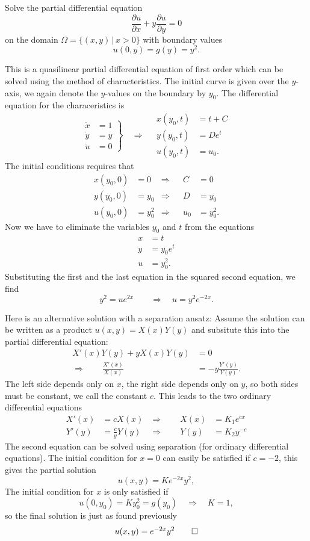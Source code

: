 Solve the partial differential equation
\[
\frac{\partial u}{\partial x}+y\frac{\partial u}{\partial y}=0
\]
on the domain
$\Omega=\{(x,y)\,|\, x> 0\}$ with boundary values
\[
u(0,y)=g(y)=y^2.
\]

\begin{loesung}
This is a quasilinear partial differential equation of first order
which can be solved using the method of characteristics.
The initial curve is given over the $y$-axis, we again denote the
$y$-values on the boundary by $y_0$.
The differential equation for the characeristics is
\[
\left.
\begin{aligned}
\dot x&=1\\
\dot y&=y\\
\dot u&=0
\end{aligned}
\right\}\quad\Rightarrow\quad
\begin{aligned}
x(y_0,t)&=t+C\\
y(y_0,t)&=De^t\\
u(y_0,t)&=u_0.
\end{aligned}
\]
The initial conditions requires that
\begin{align*}
x(y_0,0)&=0&\Rightarrow&&C&=0\\
y(y_0,0)&=y_0&\Rightarrow&&D&=y_0\\
u(y_0,0)&=y_0^2&\Rightarrow&&u_0&=y_0^2.
\end{align*}
Now we have to eliminate the variables $y_0$ and $t$ from the equations
\begin{align*}
x&=t\\
y&=y_0e^t\\
u&=y_0^2.
\end{align*}
Substituting the first and the last equation in the squared second
equation, we find
\[
y^2=ue^{2x}\qquad\Rightarrow\quad u=y^2e^{-2x}.
\]

Here is an alternative solution with a separation ansatz:
Assume the solution can be written as a product $u(x,y)=X(x)Y(y)$
and subsitute this into the partial differential equation:
\begin{align*}
X'(x)Y(y)+yX(x)Y(y)&=0\\
\Rightarrow\qquad \frac{X'(x)}{X(x)}&=-y\frac{Y'(y)}{Y(y)}.
\end{align*}
The left side depends only on $x$, the right side depends only on $y$,
so both sides must be constant, we call the constant $c$.
This leads to the two ordinary differential equations
\begin{align*}
X'(x)&=cX(x)&\Rightarrow\qquad X(x)&=K_1e^{cx}\\
Y'(y)&=\frac{c}{y}Y(y)&\Rightarrow\qquad Y(y)&=K_2y^{-c}
\end{align*}
The second equation can be solved using separation (for ordinary
differential equations).
The initial condition for $x=0$ can easily be satisfied if
$c=-2$, this gives the partial solution
\[
u(x,y)=Ke^{-2x}y^2,
\]
The initial condition for $x$ is only satisfied  if
\[
u(0,y_0)=Ky_0^2=g(y_0)\quad\Rightarrow\quad K=1,
\]
so the final solution is just as found previously
\[
u(x,y)=e^{-2x}y^2
\qedhere
\]
\end{loesung}
